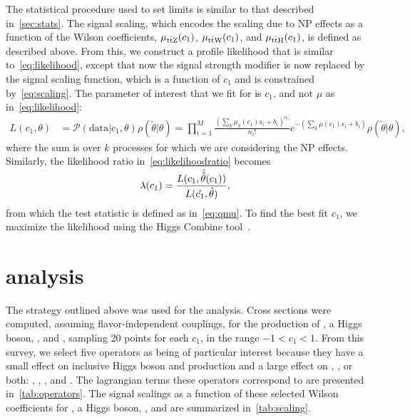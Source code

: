 The statistical procedure used to set limits is similar to that described
in~\cref{sec:stats}. The signal scaling, which encodes the scaling due to NP
effects as a function of the Wilson coefficients, $\mu_{\text{t}\bar{\text{t}}\text{Z}}(c_1)$,
$\mu_{\text{t}\bar{\text{t}}\text{W}}(c_1)$, and $\mu_{\text{t}\bar{\text{t}}\text{H}}(c_1)$, is defined as described above. From
this, we construct a profile likelihood that is similar to~\cref{eq:likelihood},
except that now the signal strength modifier is now replaced by the signal
scaling function, which is a function of $c_1$ and is constrained
by~\cref{eq:scaling}. The parameter of interest that we fit for is $c_1$, and
not $\mu$ as in~\cref{eq:likelihood}:
\begin{align}
  L(c_1, \theta) &= \mathcal{P}(\text{data}|c_1, \theta)\rho(\widetilde{\theta}|\theta) = \prod_{i=1}^{M} \frac{(\sum_k\mu_k(c_1) s_i + b_i)^{n_i}}{n_i!} e^{-(\sum_k\mu(c_1) s_i + b_i)} \rho(\widetilde{\theta}|\theta),
  \label{eq:np-likelihood}
\end{align}
where the sum is over $k$ processes for which we are considering the NP effects.
Similarly, the likelihood ratio in~\cref{eq:likelihoodratio} becomes
\begin{equation}
\lambda(c_1) = \frac{L(c_1, \smash{\hat{\hat{\theta}}}(c_1))}{L(\hat{c_1}, \hat{\theta})},
\end{equation}
from which the test statistic is defined as in~\cref{eq:qmu}. To find the best
fit $c_1$, we maximize the likelihood using the Higgs Combine
tool~\cite{ATL-PHYS-PUB-2011-011}.

\section{\eightTeV analysis}
\label{sec:8-eft}
The strategy outlined above was used for the \eightTeV analysis. Cross sections
were computed, assuming flavor-independent couplings, for the production of
\ttbar, a Higgs boson, \ttZ, and \ttW, sampling 20 points for each $c_1$, in the
range $-1 < c_1 < 1$. From this survey, we select five operators as being of
particular interest because they have a small effect on inclusive Higgs boson
and \ttbar production and a large effect on \ttZ, \ttW, or both: \cuB, \cHQ,
\cpHQ, \cHu and \cthreeW. The lagrangian terms these operators correspond to are
presented in~\cref{tab:operators}. The signal scalings as a function of these
selected Wilson coefficients for \ttbar, a Higgs boson, \ttZ, and \ttW are
summarized in~\cref{tab:scaling}.

